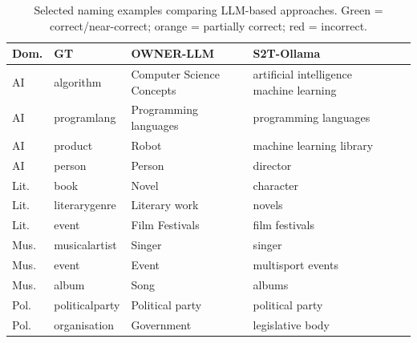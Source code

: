 \documentclass[11pt,a4paper]{article}
\begin{document}
\begin{table}[h]
\centering
\caption{Selected naming examples comparing LLM-based approaches.
\textcolor{green!60!black}{Green} = correct/near-correct;
\textcolor{orange!70!black}{orange} = partially correct;
\textcolor{red!70!black}{red} = incorrect.}
\label{tab:examples}
\setlength{\tabcolsep}{4pt}
\small
\begin{tabularx}{\textwidth}{l l X X X}
\toprule
\textbf{Dom.} & \textbf{GT} & \textbf{OWNER-LLM} & \textbf{S2T-Ollama} \\
\midrule
AI   & algorithm     & \textcolor{orange!70!black}{Computer Science Concepts} & \textcolor{orange!70!black}{artificial intelligence machine learning} \\
AI   & programlang   & \textcolor{green!60!black}{Programming languages}      & \textcolor{green!60!black}{programming languages} \\
AI   & product       & \textcolor{orange!70!black}{Robot}                      & \textcolor{green!60!black}{machine learning library} \\
AI   & person        & \textcolor{green!60!black}{Person}                      & \textcolor{orange!70!black}{director} \\
\midrule
Lit. & book          & \textcolor{green!60!black}{Novel}                       & \textcolor{orange!70!black}{character} \\
Lit. & literarygenre & \textcolor{orange!70!black}{Literary work}               & \textcolor{red!70!black}{novels} \\
Lit. & event         & \textcolor{orange!70!black}{Film Festivals}              & \textcolor{green!60!black}{film festivals} \\
\midrule
Mus. & musicalartist & \textcolor{green!60!black}{Singer}                      & \textcolor{green!60!black}{singer} \\
Mus. & event         & \textcolor{green!60!black}{Event}                       & \textcolor{orange!70!black}{multisport events} \\
Mus. & album         & \textcolor{red!70!black}{Song}                          & \textcolor{green!60!black}{albums} \\
\midrule
Pol. & politicalparty & \textcolor{green!60!black}{Political party}             & \textcolor{green!60!black}{political party} \\
Pol. & organisation  & \textcolor{green!60!black}{Government}                  & \textcolor{green!60!black}{legislative body} \\

\end{tabularx}
\end{table}
\end{document}
